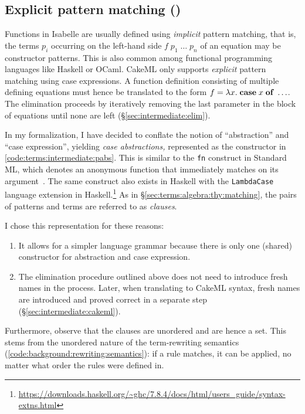 \subsection{Explicit pattern matching ()}
\label{sec:terms:types:pterm}

Functions in Isabelle are usually defined using \emph{implicit} pattern matching, that is, the terms $p_i$ occurring on the left-hand side $f\;p_1\;\ldots\;p_n$ of an equation may be constructor patterns.
This is also common among functional programming languages like Haskell or OCaml.
CakeML only supports \emph{explicit} pattern matching using case expressions.
A function definition consisting of multiple defining equations must hence be translated to the form $f = \lambda x.\;\mathtt{\mathbf{case}}\;x\;\mathtt{\mathbf{of}}\;\ldots$.
The elimination proceeds by iteratively removing the last parameter in the block of equations until none are left (§\ref{sec:intermediate:elim}).

In my formalization, I have decided to conflate the notion of ``abstraction'' and ``case expression'', yielding \emph{case abstractions,} represented as the  constructor in \cref{code:terms:intermediate:pabs}.
This is similar to the \texttt{fn} construct in Standard ML, which denotes an anonymous function that immediately matches on its argument~\cite{milner1997definition}.
The same construct also exists in Haskell with the \texttt{LambdaCase} language extension in Haskell.\footnote{\url{https://downloads.haskell.org/~ghc/7.8.4/docs/html/users_guide/syntax-extns.html}}
As in §\ref{sec:terms:algebra:thy:matching}, the pairs of patterns and terms are referred to as \emph{clauses}.

I chose this representation for these reasons:
\begin{enumerate}
  \item
    It allows for a simpler language grammar because there is only one (shared) constructor for abstraction and case expression.
  \item
    The elimination procedure outlined above does not need to introduce fresh names in the process.
    Later, when translating to CakeML syntax, fresh names are introduced and proved correct in a separate step (§\ref{sec:intermediate:cakeml}).
\end{enumerate}

\noindent
Furthermore, observe that the clauses are unordered and are hence a set.
This stems from the unordered nature of the term-rewriting semantics (\cref{code:background:rewriting:semantics}): if a rule matches, it can be applied, no matter what order the rules were defined in.

